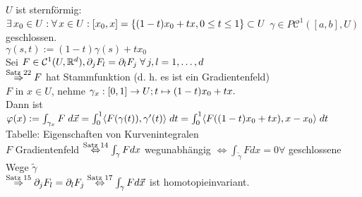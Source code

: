 \documentclass[../ana2.tex]{subfiles}
\begin{document}
\begin{bsp}
    \( U \) ist sternförmig: \\
    \( \exists x_0 \in U: \forall x \in U: [x_0, x] 
    = \set{ (1-t)x_0 + tx, 0 \leq t \leq 1 } \subset U \)
    \( \gamma \in P \mathcal{C}^1([a,b], U) \) geschlossen.\\
    \( \gamma(s,t) := (1-t)\gamma(s) + tx_0 \)\\
    Sei \( F \in \mathcal{C}^1(U, \R^d), \partial_jF_l = \partial_l F_j 
    \; \forall j, l = 1,\ldots, d\)\\
    \(\oversett{Satz 22}{\Rightarrow} F\) hat Stammfunktion (d. h. es ist ein Gradientenfeld)\\
    \(F\) in \(x \in U\), nehme \(\abb{\gamma_x}{[0,1]}{U}; t \mapsto (1-t)x_0 + tx.\)\\
    Dann ist \( \varphi(x) := \int_{\gamma_x} F \; d\vec{x} 
    = \integralx{\scalarprod{F(\gamma(t))}{\gamma'(t)}}{0}{1}{t} 
    = \integralx{\scalarprod{F((1-t)x_0 + tx)}{x - x_0}}{0}{1}{t} \)\\
    Tabelle: Eigenschaften von Kurvenintegralen\\
    \(F\) Gradientenfeld \(\oversett{Satz 14}{\Leftrightarrow} \int_\gamma F dx\)
    wegunabhängig \(\Leftrightarrow \int_{\tilde{\gamma}} F dx = 0 \forall \) geschlossene Wege \(\tilde{\gamma}\)\\
    \( \oversett{Satz 15}{\Rightarrow} \partial_j F_l = \partial_l F_j 
    \oversett{Satz 17}{\Leftrightarrow} \int_\gamma F d\vec{x} \) ist 
    homotopieinvariant.
\end{bsp}
\end{document}
